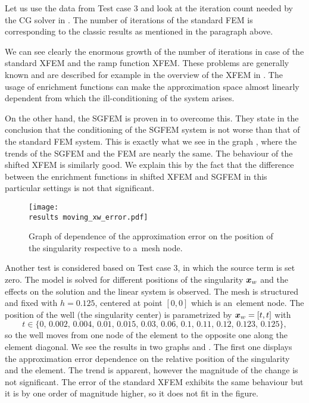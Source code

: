 Let us use the data from Test case 3 and look at the iteration count needed by the CG solver in .
The number of iterations of the standard FEM is corresponding to the classic results as mentioned in the paragraph above. 

We can see clearly the enormous growth of the number of iterations in case of the standard XFEM and the ramp 
function XFEM. These problems are generally known and are described for example in the overview of the XFEM in
\cite{fries_xfem_overview_2010}. The usage of enrichment functions can make the approximation space almost linearly 
dependent from which the ill-conditioning of the system arises. 

On the other hand, the SGFEM is proven in \cite{babuska_stable_2012} to overcome this. They state in the conclusion that
the conditioning of the SGFEM system is not worse than that of the standard FEM system.
This is exactly what we see in the graph , where the trends of the SGFEM and the FEM are nearly the same.
The behaviour of the shifted XFEM is similarly good. We explain this by the fact that the difference between the enrichment functions
in shifted XFEM and SGFEM in this particular settings is not that significant.


\begin{figure}[!htb]
  \centering    
    \texttt{[image: \\results moving\_xw\_error.pdf]}
  \caption[Approximation error dependence on singularity position]{Graph of dependence of the approximation error
   on the position of the singularity respective to a~mesh node.}
  \label{fig:moving_xw_error}
\end{figure}
%
Another test is considered based on Test case 3, in which the source term is set zero. The model is solved for different 
positions of the singularity $\mathbf{\boldsymbol{x}}_w$ and the effects on the solution and the linear system is observed. The mesh is structured and fixed with $h=0.125$,
centered at point $[0,0]$ which is an~element node. The position of the well (the singularity center) is parametrized by $\mathbf{\boldsymbol{x}}_w = [t,t]$ with 
\[t\in\{0,\, 0.002,\, 0.004,\, 0.01,\, 0.015,\, 0.03,\, 0.06,\, 0.1,\, 0.11,\, 0.12,\, 0.123,\, 0.125\},\]
so the well moves from one node of the element to the opposite one along the element diagonal. 
We see the results in two graphs  and . The first one displays
the approximation error dependence on the relative position of the singularity and the element. The trend is apparent,
however the magnitude of the change is not significant. The error of the standard XFEM exhibits the same behaviour
but it is by one order of magnitude higher, so it does not fit in the figure.

